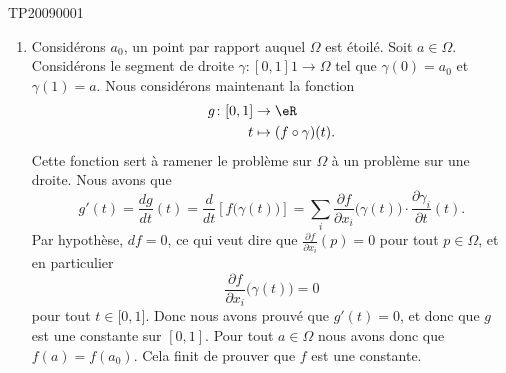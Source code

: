 \begin{corrige}{TP20090001}
\begin{enumerate}
		\item
			Considérons $a_0$, un point par rapport auquel $\Omega$ est étoilé. Soit $a\in\Omega$. Considérons le segment de droite $\gamma\colon [0,1]1\to \Omega$ tel que $\gamma(0)=a_0$ et $\gamma(1)=a$. Nous considérons maintenant la fonction
			\begin{equation}
				\begin{aligned}
					g\colon [0,1]&\to \eR \\
					t&\mapsto (f\circ \gamma)(t). 
				\end{aligned}
			\end{equation}
			Cette fonction sert à ramener le problème sur $\Omega$ à un problème sur une droite. Nous avons que 
			\begin{equation}
				g'(t)=\frac{ dg }{ dt }(t)=\frac{ d }{ dt }\left[ f\big( \gamma(t) \big) \right]=\sum_i\frac{ \partial f }{ \partial x_i }\big( \gamma(t) \big)\cdot\frac{ \partial \gamma_i }{ \partial t }(t).
			\end{equation}
			Par hypothèse, $df=0$, ce qui veut dire que $\frac{ \partial f }{ \partial x_i }(p)=0$ pour tout $p\in\Omega$, et en particulier
			\begin{equation}
				\frac{ \partial f }{ \partial x_i }\big( \gamma(t) \big)=0
			\end{equation}
			pour tout $t\in\mathopen[ 0 , 1 \mathclose]$. Donc nous avons prouvé que $g'(t)=0$, et donc que $g$ est une constante sur $[0,1]$. Pour tout $a\in\Omega$ nous avons donc que $f(a)=f(a_0)$. Cela finit de prouver que $f$ est une constante.

	\end{enumerate}

\end{corrige}
